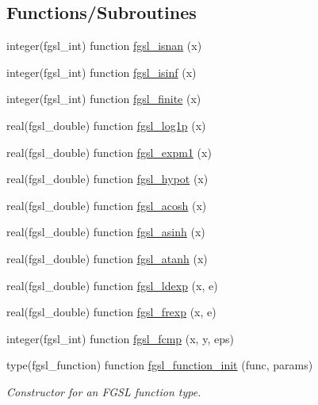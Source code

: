 \subsection*{Functions/\-Subroutines}
\begin{DoxyCompactItemize}
\item 
integer(fgsl\-\_\-int) function \hyperlink{math_8finc_a5067c8634bbc3cd88a507d8816134d40}{fgsl\-\_\-isnan} (x)
\item 
integer(fgsl\-\_\-int) function \hyperlink{math_8finc_aa3b31b6c56e2b1a862bcaced664803fc}{fgsl\-\_\-isinf} (x)
\item 
integer(fgsl\-\_\-int) function \hyperlink{math_8finc_a740aba8e50497aee7f31503b9fa4ba6b}{fgsl\-\_\-finite} (x)
\item 
real(fgsl\-\_\-double) function \hyperlink{math_8finc_ae1ca85647dff8d9f70b3126845c87443}{fgsl\-\_\-log1p} (x)
\item 
real(fgsl\-\_\-double) function \hyperlink{math_8finc_ab63b6ca1585dc1aa1ad824c6621eed51}{fgsl\-\_\-expm1} (x)
\item 
real(fgsl\-\_\-double) function \hyperlink{math_8finc_a858ffc14e46856a4c9b10b7b1a19a7e7}{fgsl\-\_\-hypot} (x)
\item 
real(fgsl\-\_\-double) function \hyperlink{math_8finc_af7330c8b04fc10b1850f2d4ce9291690}{fgsl\-\_\-acosh} (x)
\item 
real(fgsl\-\_\-double) function \hyperlink{math_8finc_a2d2d1b0a15932d8bbf2741cd2e7a4ba2}{fgsl\-\_\-asinh} (x)
\item 
real(fgsl\-\_\-double) function \hyperlink{math_8finc_a82dce86ff9a928aba7b35f9af6a9f5cc}{fgsl\-\_\-atanh} (x)
\item 
real(fgsl\-\_\-double) function \hyperlink{math_8finc_a4673afab0b7df7e7e3f05a057b5f8486}{fgsl\-\_\-ldexp} (x, e)
\item 
real(fgsl\-\_\-double) function \hyperlink{math_8finc_a178abc026a08abbe00d18c0fe8976135}{fgsl\-\_\-frexp} (x, e)
\item 
integer(fgsl\-\_\-int) function \hyperlink{math_8finc_ab40b3e555596120ef1e85184704415ca}{fgsl\-\_\-fcmp} (x, y, eps)
\item 
type(fgsl\-\_\-function) function \hyperlink{math_8finc_a3763fefa672f280ed40fb19756dbd88c}{fgsl\-\_\-function\-\_\-init} (func, params)
\begin{DoxyCompactList}\small\item\em Constructor for an F\-G\-S\-L function type. \end{DoxyCompactList}\item 

\end{DoxyCompactItemize}
